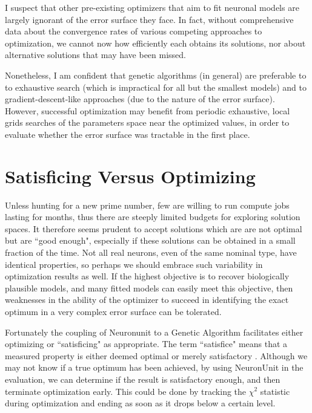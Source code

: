 I suspect that other pre-existing optimizers that aim to fit neuronal models are largely ignorant of the error surface they face.
In fact, without comprehensive data about the convergence rates of various competing approaches to optimization, we cannot now how efficiently each obtains its solutions, nor about alternative solutions that may have been missed.

Nonetheless, I am confident that genetic algorithms (in general) are preferable to to exhaustive search (which is impractical for all but the smallest models) and to gradient-descent-like approaches (due to the nature of the error surface).
However, successful optimization may benefit from periodic exhaustive, local grids searches of the parameters space near the optimized values, in order to evaluate whether the error surface was tractable in the first place.

\section{Satisficing Versus Optimizing}
Unless hunting for a new prime number, few are willing to run compute jobs lasting for months, thus there are steeply limited budgets for exploring solution spaces. It therefore seems prudent to accept solutions which are are not optimal but are ``good enough", especially if these solutions can be obtained in a small fraction of the time.
Not all real neurons, even of the same nominal type, have identical properties, so perhaps we should embrace such variability in optimization results as well.
If the highest objective is to recover biologically plausible models, and many fitted models can easily meet this objective, then weaknesses in the ability of the optimizer to succeed in identifying the exact optimum in a very complex error surface can be tolerated.

Fortunately the coupling of Neuronunit to a Genetic Algorithm facilitates either optimizing or ``satisficing" as appropriate.
The term ``satisfice" means that a measured property is either deemed optimal or merely satisfactory \citep{simon1956rational}.
Although we may not know if a true optimum has been achieved, by using NeuronUnit in the evaluation, we can determine if the result is satisfactory enough, and then terminate optimization early.
This could be done by tracking the $\chi^2$ statistic during optimization and ending as soon as it drops below a certain level.
